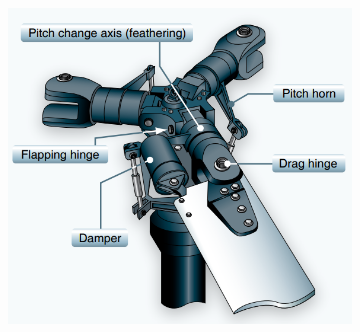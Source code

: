 \begin{figure}[H]
	\centering
		\begin{subfigure}{0.4\textwidth}
		\centering
		\includegraphics[width=\linewidth]{gambar/feather_flap.png}
		\caption{}
		\label{fig:featherflap}
	\end{subfigure}
	\centering
	\begin{subfigure}{0.17\textwidth}
		\centering

\end{subfigure}
\end{figure}
